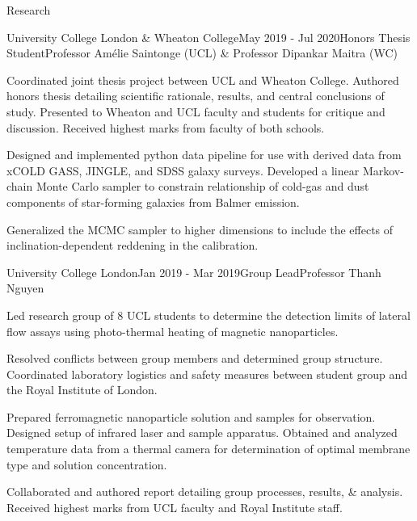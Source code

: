 \documentclass{resume} %
\begin{document}
\begin{rSection}{Research}
\begin{rSubsection}{University College London \& Wheaton College}{May 2019 - Jul 2020}{Honors Thesis Student}{Professor Am\'{e}lie Saintonge (UCL) \& Professor Dipankar Maitra (WC)}
\item Coordinated joint thesis project between UCL and Wheaton College. Authored honors thesis detailing scientific rationale, results, and central conclusions of study. Presented to Wheaton and UCL faculty and students for critique and discussion. Received highest marks from faculty of both schools.
\item Designed and implemented python data pipeline for use with derived data from xCOLD GASS, JINGLE, and SDSS galaxy surveys. Developed a linear Markov-chain Monte Carlo sampler to constrain relationship of cold-gas and dust components of star-forming galaxies from Balmer emission.
\item Generalized the MCMC sampler to higher dimensions to include the effects of inclination-dependent reddening in the calibration.
\end{rSubsection}
\begin{rSubsection}{University College London}{Jan 2019 - Mar 2019}{Group Lead}{Professor Thanh Nguyen}
\item Led research group of 8 UCL students to determine the detection limits of lateral flow assays using photo-thermal heating of magnetic nanoparticles.
\item Resolved conflicts between group members and determined group structure. Coordinated laboratory logistics and safety measures between student group and the Royal Institute of London.
\item Prepared ferromagnetic nanoparticle solution and samples for observation. Designed setup of infrared laser and sample apparatus. Obtained and analyzed temperature data from a thermal camera for determination of optimal membrane type and solution concentration.
\item Collaborated and authored report detailing group processes, results, \& analysis. Received highest marks from UCL faculty and Royal Institute staff.
\end{rSubsection}


\end{rSection}
\end{document}
